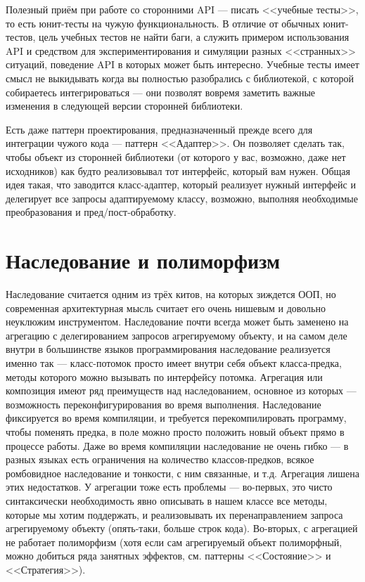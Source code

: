 \documentclass[a5paper]{article}
\begin{document}
Полезный приём при работе со сторонними API --- писать <<учебные тесты>>, то есть юнит-тесты на чужую функциональность. В отличие от обычных юнит-тестов, цель учебных тестов не найти баги, а служить примером использования API и средством для экспериментирования и симуляции разных <<странных>> ситуаций, поведение API в которых может быть интересно. Учебные тесты имеет смысл не выкидывать когда вы полностью разобрались с библиотекой, с которой собираетесь интегрироваться --- они позволят вовремя заметить важные изменения в следующей версии сторонней библиотеки.

Есть даже паттерн проектирования, предназначенный прежде всего для интеграции чужого кода --- паттерн <<Адаптер>>. Он позволяет сделать так, чтобы объект из сторонней библиотеки (от которого у вас, возможно, даже нет исходников) как будто реализовывал тот интерфейс, который вам нужен. Общая идея такая, что заводится класс-адаптер, который реализует нужный интерфейс и делегирует все запросы адаптируемому классу, возможно, выполняя необходимые преобразования и пред/пост-обработку.

\section{Наследование и полиморфизм}

Наследование считается одним из трёх китов, на которых зиждется ООП, но современная архитектурная мысль считает его очень нишевым и довольно неуклюжим инструментом. Наследование почти всегда может быть заменено на агрегацию с делегированием запросов агрегируемому объекту, и на самом деле внутри в большинстве языков программирования наследование реализуется именно так --- класс-потомок просто имеет внутри себя объект класса-предка, методы которого можно вызывать по интерфейсу потомка. Агрегация или композиция имеют ряд преимуществ над наследованием, основное из которых --- возможность переконфигурирования во время выполнения. Наследование фиксируется во время компиляции, и требуется перекомпилировать программу, чтобы поменять предка, в поле можно просто положить новый объект прямо в процессе работы. Даже во время компиляции наследование не очень гибко --- в разных языках есть ограничения на количество классов-предков, всякое ромбовидное наследование и тонкости, с ним связанные, и т.д. Агрегация лишена этих недостатков. У агрегации тоже есть проблемы --- во-первых, это чисто синтаксически необходимость явно описывать в нашем классе все методы, которые мы хотим поддержать, и реализовывать их перенаправлением запроса агрегируемому объекту (опять-таки, больше строк кода). Во-вторых, с агрегацией не работает полиморфизм (хотя если сам агрегируемый объект полиморфный, можно добиться ряда занятных эффектов, см. паттерны <<Состояние>> и <<Стратегия>>).
\end{document}
